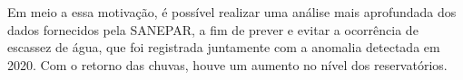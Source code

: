   Em meio a essa motivação, é possível realizar uma análise mais aprofundada dos dados fornecidos pela SANEPAR, a fim de prever e evitar a ocorrência de escassez de água, que foi registrada juntamente com a anomalia detectada em 2020. Com o retorno das chuvas, houve um aumento no nível dos reservatórios.
    
    